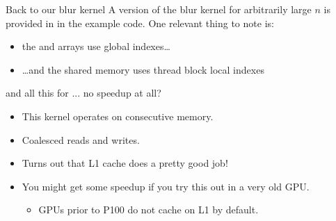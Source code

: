 \documentclass[aspectratio=43]{beamer}
\begin{document}
\begin{frame}[fragile]{Back to our blur kernel}
        A version of the blur kernel for arbitrarily large $n$ is provided in  in the example code. One relevant thing to note is:
        \begin{itemize}
            \item  the  and  arrays use global indexes\dots
            \item  \dots and the shared memory uses thread block local indexes
        \end{itemize}

    \begin{info}{and all this for ... no speedup at all?}
        \begin{itemize}
            \item This kernel operates on consecutive memory.
            \item Coalesced reads and writes.
            \item Turns out that L1 cache does a pretty good job!
            \item You might get some speedup if you try this out in a very old GPU.
            \begin{itemize}
                \item GPUs prior to P100 do not cache on L1 by default.
            \end{itemize}
        \end{itemize}
    \end{info}

\end{frame}
\end{document}
